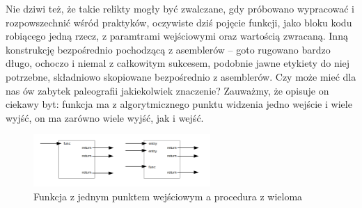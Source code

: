 Nie dziwi też, że takie relikty mogły być zwalczane, gdy próbowano wypracować i rozpowszechnić wśród praktyków, oczywiste dziś pojęcie funkcji, jako bloku kodu robiącego jedną rzecz, z paramtrami wejściowymi oraz wartością zwracaną. Inną konstrukcję bezpośrednio pochodzącą z asemblerów – goto rugowano bardzo długo, ochoczo i niemal z całkowitym sukcesem, podobnie jawne etykiety do niej potrzebne, składniowo skopiowane bezpośrednio z asemblerów. Czy może mieć dla nas ów zabytek paleografii jakiekolwiek znaczenie? Zauważmy, że opisuje on ciekawy byt: funkcja ma z algorytmicznego punktu widzenia jedno wejście i wiele wyjść, on ma zarówno wiele wyjść, jak i wejść.
\begin{figure}[h]
    \centering
    \includegraphics[width=0.6\textwidth]{images/wywod/pudelka.png}
    \caption{Funkcja z jednym punktem wejściowym a procedura z wieloma}
\end{figure}

